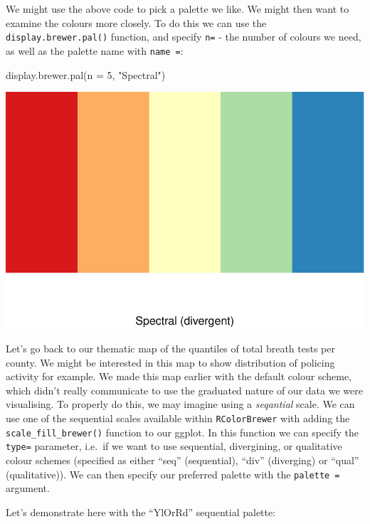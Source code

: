\documentclass[
]{book}
\makeatletter
\newenvironment{Shaded}{\begin{snugshade}}{\end{snugshade}}
\newcommand{\AttributeTok}[1]{\textcolor[rgb]{0.61,0.61,0.61}{#1}}
\newcommand{\DecValTok}[1]{\textcolor[rgb]{0.06,0.06,0.06}{#1}}
\newcommand{\FunctionTok}[1]{\textcolor[rgb]{0,0,0}{#1}}
\newcommand{\NormalTok}[1]{#1}
\newcommand{\StringTok}[1]{\textcolor[rgb]{0.5,0.5,0.5}{#1}}
\newenvironment{kframe}{%
\medskip{}
\setlength{\fboxsep}{.8em}
 \def\at@end@of@kframe{}%
 \ifinner\ifhmode%
  \def\at@end@of@kframe{\end{minipage}}%
  \begin{minipage}{\columnwidth}%
 \fi\fi%
 \def\FrameCommand##1{\hskip\@totalleftmargin \hskip-\fboxsep
 \colorbox{shadecolor}{##1}\hskip-\fboxsep
     \hskip-\linewidth \hskip-\@totalleftmargin \hskip\columnwidth}%
 \MakeFramed {\advance\hsize-\width
   \@totalleftmargin\z@ \linewidth\hsize
   \@setminipage}}%
 {\par\unskip\endMakeFramed%
 \at@end@of@kframe}
\renewenvironment{Shaded}{\begin{kframe}}{\end{kframe}}
\makeatother
\begin{document}
We might use the above code to pick a palette we like. We might then want to examine the colours more closely. To do this we can use the \texttt{display.brewer.pal()} function, and specify \texttt{n=} - the number of colours we need, as well as the palette name with \texttt{name\ =}:

\begin{Shaded}
\begin{Highlighting}[]
\FunctionTok{display.brewer.pal}\NormalTok{(}\AttributeTok{n =} \DecValTok{5}\NormalTok{, }\StringTok{"Spectral"}\NormalTok{)}
\end{Highlighting}
\end{Shaded}

\includegraphics{crime_mapping_files/figure-latex/unnamed-chunk-157-1.pdf}

Let's go back to our thematic map of the quantiles of total breath tests per county. We might be interested in this map to show distribution of policing activity for example. We made this map earlier with the default colour scheme, which didn't really communicate to use the graduated nature of our data we were visualising. To properly do this, we may imagine using a \emph{seqantial} scale. We can use one of the sequential scales available within \texttt{RColorBrewer} with adding the \texttt{scale\_fill\_brewer()} function to our ggplot. In this function we can specify the \texttt{type=} parameter, i.e.~if we want to use sequential, divergining, or qualitative colour schemes (specified as either ``seq'' (sequential), ``div'' (diverging) or ``qual'' (qualitative)). We can then specify our preferred palette with the \texttt{palette\ =} argument.

Let's demonstrate here with the ``YlOrRd'' sequential palette:
\end{document}
